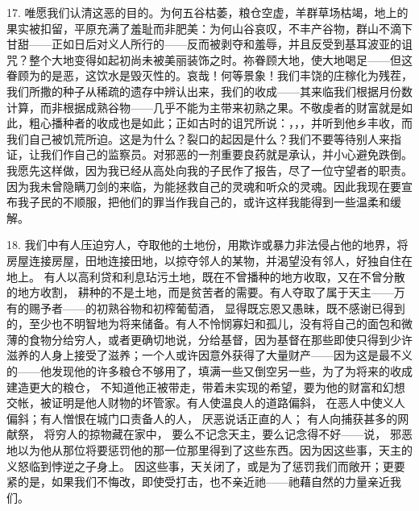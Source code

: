 17. 唯愿我们认清这恶的目的。为何五谷枯萎，粮仓空虚，羊群草场枯竭，地上的果实被扣留，平原充满了羞耻而非肥美：为何山谷哀叹，不丰产谷物，群山不滴下甘甜——正如日后对义人所行的——反而被剥夺和羞辱，并且反受到基耳波亚的诅咒？整个大地变得如起初尚未被美丽装饰之时。祢眷顾大地，使大地喝足——但这眷顾为的是恶，这饮水是毁灭性的。哀哉！何等景象！我们丰饶的庄稼化为残茬，我们所撒的种子从稀疏的遗存中辨认出来，我们的收成——其来临我们根据月份数计算，而非根据成熟谷物——几乎不能为主带来初熟之果。不敬虔者的财富就是如此，粗心播种者的收成也是如此；正如古时的诅咒所说：，，，并听到他乡丰收，而我们自己被饥荒所迫。这是为什么？裂口的起因是什么？我们不要等待别人来指证，让我们作自己的监察员。对邪恶的一剂重要良药就是承认，并小心避免跌倒。我愿先这样做，因为我已经从高处向我的子民作了报告，尽了一位守望者的职责。因为我未曾隐瞒刀剑的来临，为能拯救自己的灵魂和听众的灵魂。因此我现在要宣布我子民的不顺服，把他们的罪当作我自己的，或许这样我能得到一些温柔和缓解。\par

18. 我们中有人压迫穷人，夺取他的土地份，用欺诈或暴力非法侵占他的地界，将房屋连接房屋，田地连接田地，以掠夺邻人的某物，并渴望没有邻人，好独自住在地上。 有人以高利贷和利息玷污土地，既在不曾播种的地方收取，又在不曾分散的地方收割， 耕种的不是土地，而是贫苦者的需要。有人夺取了属于天主——万有的赐予者——的初熟谷物和初榨葡萄酒， 显得既忘恩又愚昧，既不感谢已得到的，至少也不明智地为将来储备。有人不怜悯寡妇和孤儿，没有将自己的面包和微薄的食物分给穷人，或者更确切地说，分给基督，因为基督在那些即使只得到少许滋养的人身上接受了滋养；一个人或许因意外获得了大量财产——因为这是最不义的——他发现他的许多粮仓不够用了，填满一些又倒空另一些，为了为将来的收成建造更大的粮仓， 不知道他正被带走，带着未实现的希望，要为他的财富和幻想交帐，被证明是他人财物的坏管家。有人使温良人的道路偏斜， 在恶人中使义人偏斜；有人憎恨在城门口责备人的人， 厌恶说话正直的人； 有人向捕获甚多的网献祭， 将穷人的掠物藏在家中， 要么不记念天主，要么记念得不好——说， 邪恶地以为他从那位将要惩罚他的那一位那里得到了这些东西。因为因这些事，天主的义怒临到悖逆之子身上。 因这些事，天关闭了，或是为了惩罚我们而敞开；更要紧的是，如果我们不悔改，即使受打击，也不亲近祂——祂藉自然的力量亲近我们。\par

